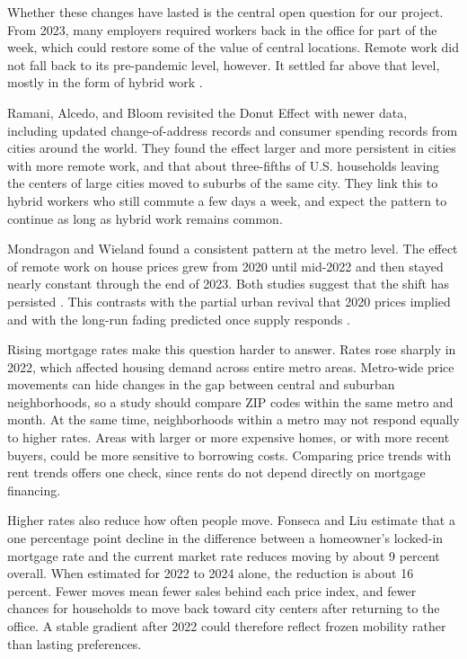 \documentclass[11pt]{article}
\begin{document}
Whether these changes have lasted is the central open question for our project. From 2023, many employers required workers back in the office for part of the week, which could restore some of the value of central locations. Remote work did not fall back to its pre-pandemic level, however. It settled far above that level, mostly in the form of hybrid work \cite{barrero2023evolution,ramani2024reshapes}.

Ramani, Alcedo, and Bloom \cite{ramani2024reshapes} revisited the Donut Effect with newer data, including updated change-of-address records and consumer spending records from cities around the world. They found the effect larger and more persistent in cities with more remote work, and that about three-fifths of U.S. households leaving the centers of large cities moved to suburbs of the same city. They link this to hybrid workers who still commute a few days a week, and expect the pattern to continue as long as hybrid work remains common.

Mondragon and Wieland \cite{mondragon2022housing} found a consistent pattern at the metro level. The effect of remote work on house prices grew from 2020 until mid-2022 and then stayed nearly constant through the end of 2023. Both studies suggest that the shift has persisted \cite{mondragon2022housing,ramani2024reshapes}. This contrasts with the partial urban revival that 2020 prices implied \cite{gupta2022flattening} and with the long-run fading predicted once supply responds \cite{howard2023short}.

Rising mortgage rates make this question harder to answer. Rates rose sharply in 2022, which affected housing demand across entire metro areas. Metro-wide price movements can hide changes in the gap between central and suburban neighborhoods, so a study should compare ZIP codes within the same metro and month. At the same time, neighborhoods within a metro may not respond equally to higher rates. Areas with larger or more expensive homes, or with more recent buyers, could be more sensitive to borrowing costs. Comparing price trends with rent trends offers one check, since rents do not depend directly on mortgage financing.

Higher rates also reduce how often people move. Fonseca and Liu \cite{fonseca2024mortgage} estimate that a one percentage point decline in the difference between a homeowner's locked-in mortgage rate and the current market rate reduces moving by about 9 percent overall. When estimated for 2022 to 2024 alone, the reduction is about 16 percent. Fewer moves mean fewer sales behind each price index, and fewer chances for households to move back toward city centers after returning to the office. A stable gradient after 2022 could therefore reflect frozen mobility rather than lasting preferences.
\end{document}
